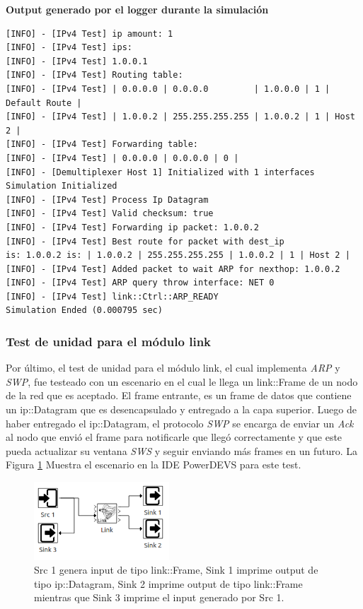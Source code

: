 \documentclass[10pt,a4paper]{article}
\begin{document}
\textbf{Output generado por el logger durante la simulación}
\begin{lstlisting}
[INFO] - [IPv4 Test] ip amount: 1
[INFO] - [IPv4 Test] ips:
[INFO] - [IPv4 Test] 1.0.0.1
[INFO] - [IPv4 Test] Routing table:
[INFO] - [IPv4 Test] | 0.0.0.0 | 0.0.0.0         | 1.0.0.0 | 1 | Default Route | 
[INFO] - [IPv4 Test] | 1.0.0.2 | 255.255.255.255 | 1.0.0.2 | 1 | Host 2 | 
[INFO] - [IPv4 Test] Forwarding table:
[INFO] - [IPv4 Test] | 0.0.0.0 | 0.0.0.0 | 0 | 
[INFO] - [Demultiplexer Host 1] Initialized with 1 interfaces
Simulation Initialized
[INFO] - [IPv4 Test] Process Ip Datagram
[INFO] - [IPv4 Test] Valid checksum: true
[INFO] - [IPv4 Test] Forwarding ip packet: 1.0.0.2
[INFO] - [IPv4 Test] Best route for packet with dest_ip 
is: 1.0.0.2 is: | 1.0.0.2 | 255.255.255.255 | 1.0.0.2 | 1 | Host 2 | 
[INFO] - [IPv4 Test] Added packet to wait ARP for nexthop: 1.0.0.2
[INFO] - [IPv4 Test] ARP query throw interface: NET 0
[INFO] - [IPv4 Test] link::Ctrl::ARP_READY
Simulation Ended (0.000795 sec)
\end{lstlisting}

\newpage

\subsubsection{Test de unidad para el módulo link}

Por último, el test de unidad para el módulo link, el cual implementa \textit{ARP} y \textit{SWP}, fue testeado con un escenario en el cual le llega un link::Frame de un nodo de la red que es aceptado. El frame entrante, es un frame de datos que contiene un ip::Datagram que es desencapsulado y entregado a la capa superior. Luego de haber entregado el ip::Datagram, el protocolo \textit{SWP} se encarga de enviar un \textit{Ack} al nodo que envió el frame para notificarle que llegó correctamente y que este pueda actualizar su ventana \textit{SWS} y seguir enviando más frames en un futuro. La Figura \ref{figure: unit test link} Muestra el escenario en la IDE PowerDEVS para este test. \\

\begin{figure}[!h]
    \centering
    \includegraphics[width = 0.45\textwidth]{img/png/unit_tests/link.png}
    \caption{Src 1 genera input de tipo link::Frame, Sink 1 imprime output de tipo ip::Datagram, Sink 2 imprime output de tipo link::Frame mientras que Sink 3 imprime el input generado por Src 1.}
    \label{figure: unit test link}
\end{figure}
\end{document}
